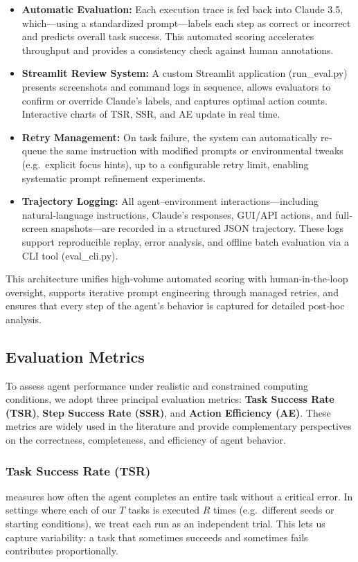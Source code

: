 \documentclass[runningheads]{llncs}
\begin{document}
\begin{itemize}[label=\textbullet,itemsep=1ex,parsep=0.5ex]
  \item \textbf{Automatic Evaluation:} Each execution trace is fed back into Claude 3.5, which—using a standardized prompt—labels each step as correct or incorrect and predicts overall task success. This automated scoring accelerates throughput and provides a consistency check against human annotations.
  \item \textbf{Streamlit Review System:} A custom Streamlit application (run\_eval.py) presents screenshots and command logs in sequence, allows evaluators to confirm or override Claude’s labels, and captures optimal action counts. Interactive charts of TSR, SSR, and AE update in real time.
  \item \textbf{Retry Management:} On task failure, the system can automatically re‐queue the same instruction with modified prompts or environmental tweaks (e.g.\ explicit focus hints), up to a configurable retry limit, enabling systematic prompt refinement experiments.
  \item \textbf{Trajectory Logging:} All agent–environment interactions—including natural‐language instructions, Claude’s responses, GUI/API actions, and full‐screen snapshots—are recorded in a structured JSON trajectory. These logs support reproducible replay, error analysis, and offline batch evaluation via a CLI tool (eval\_cli.py).
\end{itemize}

This architecture unifies high‐volume automated scoring with human‐in‐the‐loop oversight, supports iterative prompt engineering through managed retries, and ensures that every step of the agent’s behavior is captured for detailed post‐hoc analysis.  
 
\subsection{Evaluation Metrics}

To assess agent performance under realistic and constrained computing conditions, we adopt three principal evaluation metrics: \textbf{Task Success Rate (TSR)}, \textbf{Step Success Rate (SSR)}, and \textbf{Action Efficiency (AE)}. These metrics are widely used in the literature \cite{deng2023mind2web, zhang2024androidzoo, wen2024autodroid} and provide complementary perspectives on the correctness, completeness, and efficiency of agent behavior.

\subsubsection{Task Success Rate (TSR)} measures how often the agent completes an entire task without a critical error.  In settings where each of our \(T\) tasks is executed \(R\) times (e.g.\ different seeds or starting conditions), we treat each run as an independent trial.  This lets us capture variability: a task that sometimes succeeds and sometimes fails contributes proportionally.
\end{document}
